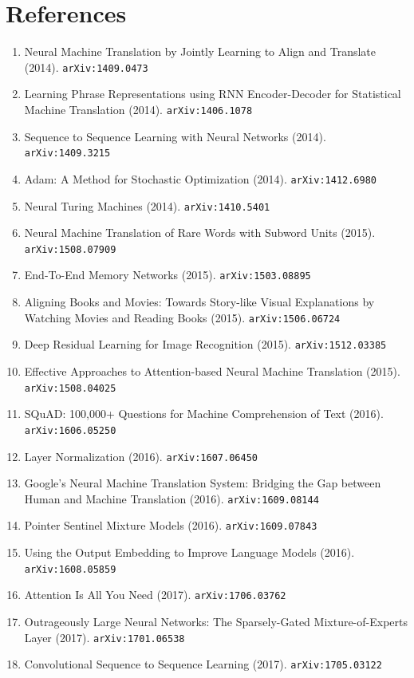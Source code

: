 \documentclass[11pt]{article}
\begin{document}
\section*{References}
\begin{enumerate}\small
  \item Neural Machine Translation by Jointly Learning to Align and Translate (2014). \texttt{arXiv:1409.0473}
  \item Learning Phrase Representations using RNN Encoder-Decoder for
  Statistical Machine Translation (2014). \texttt{arXiv:1406.1078}
  \item Sequence to Sequence Learning with Neural Networks (2014). \texttt{arXiv:1409.3215}
  \item Adam: A Method for Stochastic Optimization (2014). \texttt{arXiv:1412.6980}
  \item Neural Turing Machines (2014). \texttt{arXiv:1410.5401}
  \item Neural Machine Translation of Rare Words with Subword Units (2015). \texttt{arXiv:1508.07909}
  \item End-To-End Memory Networks (2015). \texttt{arXiv:1503.08895}
  \item Aligning Books and Movies: Towards Story-like Visual Explanations by
  Watching Movies and Reading Books (2015). \texttt{arXiv:1506.06724}
  \item Deep Residual Learning for Image Recognition (2015). \texttt{arXiv:1512.03385}
  \item Effective Approaches to Attention-based Neural Machine Translation (2015). \texttt{arXiv:1508.04025}
  \item SQuAD: 100,000+ Questions for Machine Comprehension of Text (2016). \texttt{arXiv:1606.05250}
  \item Layer Normalization (2016). \texttt{arXiv:1607.06450}
  \item Google's Neural Machine Translation System: Bridging the Gap between
  Human and Machine Translation (2016). \texttt{arXiv:1609.08144}
  \item Pointer Sentinel Mixture Models (2016). \texttt{arXiv:1609.07843}
  \item Using the Output Embedding to Improve Language Models (2016). \texttt{arXiv:1608.05859}
  \item Attention Is All You Need (2017). \texttt{arXiv:1706.03762}
  \item Outrageously Large Neural Networks: The Sparsely-Gated
  Mixture-of-Experts Layer (2017). \texttt{arXiv:1701.06538}
  \item Convolutional Sequence to Sequence Learning (2017). \texttt{arXiv:1705.03122}

\end{enumerate}
\end{document}

